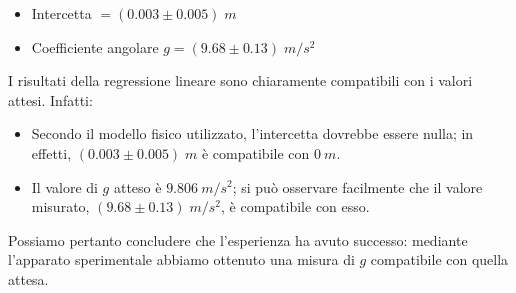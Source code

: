 \documentclass{article}
\begin{document}
\begin{itemize}
  \item Intercetta $= (0.003 \pm 0.005)\;\unit{m}$
  \item Coefficiente angolare $g = (9.68 \pm 0.13)\;\unit{m\per s^2}$
\end{itemize}
\pagebreak
I risultati della regressione lineare sono chiaramente compatibili
con i valori attesi. Infatti:
\begin{itemize}
  \item Secondo il modello fisico utilizzato, l'intercetta dovrebbe
  essere nulla; in effetti, $(0.003\pm0.005)\;\unit{m}$ è compatibile
  con $\qty{0}{m}$.
  \item Il valore di $g$ atteso è $\qty{9.806}{m\per s^2}$; si può
  osservare facilmente che il valore misurato,
  $(9.68\pm0.13)\;\unit{m \per s^2}$, è compatibile con esso.
\end{itemize}

Possiamo pertanto concludere che l'esperienza ha avuto successo:
mediante l'apparato sperimentale abbiamo ottenuto una misura di $g$
compatibile con quella attesa.
\end{document}
